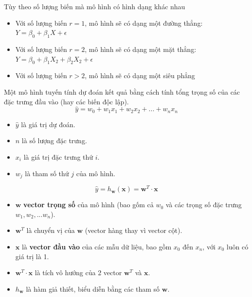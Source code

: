 \documentclass{article}
\begin{document}
	Tùy theo số lượng biến mà mô hình có hình dạng khác nhau
	\begin{itemize}
		\item Với số lượng biến $r = 1$, mô hình sẽ có dạng một đường thẳng: $Y = \beta_0 + \beta_1X + \epsilon$
		\item Với số lượng biến $r = 2$, mô hình sẽ có dạng một mặt thẳng: $Y = \beta_0 + \beta_1X_2 + \beta_2X_2 + \epsilon$
		\item Với số lượng biến $r > 2$, mô hình sẽ có dạng một siêu phẳng
	\end{itemize}
	Một mô hình tuyến tính dự đoán kết quả bằng cách tính tổng trọng số của các đặc trưng đầu vào (hay các biến độc lập). 
	$$ \hat{y}=w_0+w_1x_1+w_2x_2+...+w_nx_n $$
	\begin{itemize}
		\item $\hat{y}$ là giá trị dự đoán.
		\item $n$ là số lượng đặc trưng.
		\item $x_i$ là giá trị đặc trưng thứ $i$.
		\item $w_j$ là tham số thứ $j$ của mô hình.
	\end{itemize}
	$$\hat{y}=h_{\mathbf{w}}\left(\mathbf{x}\right)=\mathbf{w}^{T}\cdot\mathbf{x}$$
	\begin{itemize}
		\item $\mathbf{w}$ \textbf{vector trọng số} của mô hình (bao gốm cả $w_0$ và các trọng số đặc trưng $w_1,w_2,...w_n$).
		\item $\mathbf{w}^T$ là chuyển vị của $\mathbf{w}$ (vector hàng thay vì vector cột).
		\item $\mathbf{x}$ là \textbf{vector đầu vào} của các mẫu dữ liệu, bao gồm $x_0$ đến $x_n$, với $x_0$ luôn có giá trị là 1.
		\item $\mathbf{w}^{T}\cdot\mathbf{x}$ là tích vô hướng của 2 vector $\mathbf{w}^T$ và $\mathbf{x}$.
		\item $h_{\mathbf{w}}$ là hàm giả thiết, biểu diễn bằng các tham số $\mathbf{w}$.
	\end{itemize}
\end{document}

